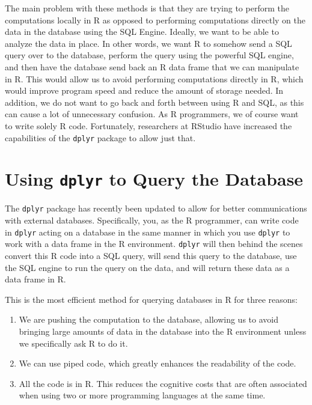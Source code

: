 \documentclass[
]{krantz}
\providecommand{\tightlist}{%
  \setlength{\itemsep}{0pt}\setlength{\parskip}{0pt}}
\begin{document}
The main problem with these methods is that they are trying to perform the computations locally in R as opposed to performing computations directly on the data in the database using the SQL Engine. Ideally, we want to be able to analyze the data in place. In other words, we want R to somehow send a SQL query over to the database, perform the query using the powerful SQL engine, and then have the database send back an R data frame that we can manipulate in R. This would allow us to avoid performing computations directly in R, which would improve program speed and reduce the amount of storage needed. In addition, we do not want to go back and forth between using R and SQL, as this can cause a lot of unnecessary confusion. As R programmers, we of course want to write solely R code. Fortunately, researchers at RStudio have increased the capabilities of the \texttt{dplyr} package to allow just that.

\hypertarget{using-dplyr-to-query-the-database}{%
\section{\texorpdfstring{Using \texttt{dplyr} to Query the Database}{Using dplyr to Query the Database}}\label{using-dplyr-to-query-the-database}}

The \texttt{dplyr} package has recently been updated to allow for better communications with external databases. Specifically, you, as the R programmer, can write code in \texttt{dplyr} acting on a database in the same manner in which you use \texttt{dplyr} to work with a data frame in the R environment. \texttt{dplyr} will then behind the scenes convert this R code into a SQL query, will send this query to the database, use the SQL engine to run the query on the data, and will return these data as a data frame in R.

This is the most efficient method for querying databases in R for three reasons:

\begin{enumerate}
\def\labelenumi{\arabic{enumi}.}
\tightlist
\item
  We are pushing the computation to the database, allowing us to avoid bringing large amounts of data in the database into the R environment unless we specifically ask R to do it.
\item
  We can use piped code, which greatly enhances the readability of the code.
\item
  All the code is in R. This reduces the cognitive costs that are often associated when using two or more programming languages at the same time.
\end{enumerate}
\end{document}
